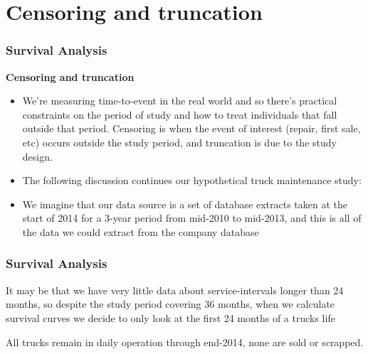 	\section{Censoring and truncation}
	\begin{frame}
		\frametitle{Survival Analysis}
		\noindent \textbf{Censoring and truncation}
		\begin{itemize}
			\item We're measuring time-to-event in the real world and so there's practical constraints on the period of study and how to treat individuals that fall outside that period. Censoring is when the event of interest (repair, first sale, etc) occurs outside the study period, and truncation is due to the study design.
			
			\item The following discussion continues our hypothetical truck maintenance study:
			
			\item We imagine that our data source is a set of database extracts taken at the start of 2014 for a 3-year period from mid-2010 to mid-2013, and this is all of the data we could extract from the company database
		\end{itemize}
		
	\end{frame}
	\begin{frame}
		\frametitle{Survival Analysis}
		
		It may be that we have very little data about service-intervals longer than 24 months, so despite the study period covering 36 months, when we calculate survival curves we decide to only look at the first 24 months of a trucks life
		
		All trucks remain in daily operation through end-2014, none are sold or scrapped.
	\end{frame}
	
